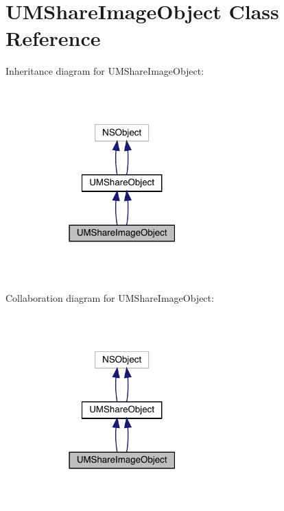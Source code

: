 \hypertarget{interface_u_m_share_image_object}{}\section{U\+M\+Share\+Image\+Object Class Reference}
\label{interface_u_m_share_image_object}


Inheritance diagram for U\+M\+Share\+Image\+Object\+:\nopagebreak
\begin{figure}[H]
\begin{center}
\leavevmode
\includegraphics[width=195pt]{interface_u_m_share_image_object__inherit__graph}
\end{center}
\end{figure}


Collaboration diagram for U\+M\+Share\+Image\+Object\+:\nopagebreak
\begin{figure}[H]
\begin{center}
\leavevmode
\includegraphics[width=195pt]{interface_u_m_share_image_object__coll__graph}
\end{center}
\end{figure}
